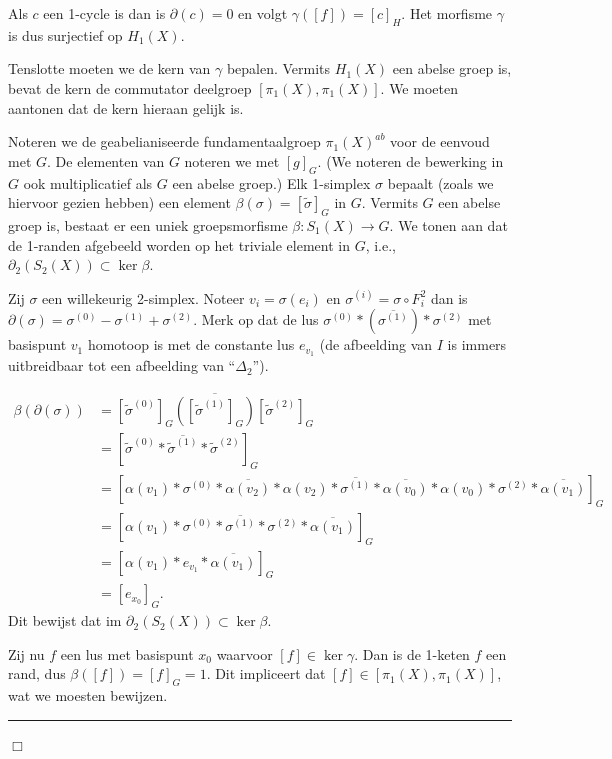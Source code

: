 \documentclass[12pt]{book}
\newcommand{\B}{\rule{1mm}{0mm} \hfill $\Box$ }
\begin{document}
Als $c$ een 1-cycle is dan is $\partial(c)=0$ en volgt
$\gamma([f])=[c]_H$. Het morfisme $\gamma$ is dus surjectief op $H_1(X)$.

Tenslotte moeten we de kern van $\gamma$ bepalen. Vermits $H_{1}(X)$ een abelse groep is, bevat de kern de commutator deelgroep $[\pi_1(X), \pi_1(X)]$. We moeten aantonen dat de kern hieraan gelijk is.

Noteren we de geabelianiseerde fundamentaalgroep $\pi_1(X)^{ab}$ voor de eenvoud met $G$. De elementen van $G$ noteren we met $[g]_G$. (We noteren de bewerking in $G$ ook multiplicatief  als $G$ een abelse groep.) Elk 1-simplex $\sigma$ bepaalt (zoals we hiervoor gezien hebben) een element $\beta(\sigma)=[\tilde{\sigma}]_G$ in $G$. Vermits $G$ een abelse groep is, bestaat er een uniek groepsmorfisme $\beta: S_{1}(X)\to G$. We tonen aan dat de 1-randen afgebeeld worden op het triviale element in $G$, i.e., $\partial_2(S_2(X))\subset \ker \beta$.

Zij $\sigma$ een willekeurig 2-simplex. Noteer $v_i=\sigma(e_i)$ en $\sigma^{(i)}=\sigma \circ F_{i}^{2}$ dan is
$\partial (\sigma)= \sigma^{(0)}-\sigma^{(1)}+\sigma^{(2)}$.  Merk op dat de lus  $\sigma^{(0)}* (\overline{\sigma^{(1)}})*\sigma^{(2)}$ met basispunt $v_1$ homotoop is met de constante lus $e_{v_{1}}$ (de afbeelding van $I$ is immers uitbreidbaar tot een afbeelding van ``$\Delta_2$'').

\begin{align*}
\beta(\partial(\sigma)) & =  [\tilde{\sigma}^{(0)}]_G \overline{([\tilde{\sigma}^{(1)}]_G)} [\tilde{\sigma}^{(2)}]_G\\
& =  [\tilde{\sigma}^{(0)}*\overline{\tilde{\sigma}^{(1)}}* \tilde{\sigma}^{(2)}]_G\\
& =  [\alpha(v_1)*\sigma^{(0)}*\overline{\alpha(v_2)}*\alpha(v_2)*\overline{\sigma^{(1)}}*\overline{\alpha(v_0)}*\alpha(v_0)*\sigma^{(2)}*\overline{\alpha(v_1)}]_G\\
& =  [\alpha(v_1)*\sigma^{(0)}*\overline{\sigma^{(1)}}*\sigma^{(2)}*\overline{\alpha(v_1)}]_G\\
& = [\alpha(v_1)*e_{v_{1}}*\overline{\alpha(v_1)}]_G\\
& = [e_{x_{0}}]_G. \end{align*}
Dit bewijst dat $\mbox{im }\partial_2(S_{2}(X))\subset \ker \beta$.

Zij nu $f$ een lus met basispunt $x_0$ waarvoor $[f]\in \ker \gamma$. Dan is de 1-keten $f$ een rand, dus $\beta([f])=[f]_G=1$. Dit impliceert dat $[f]\in [\pi_{1}(X), \pi_{1}(X)]$, wat we moesten bewijzen. \B
\end{document}
